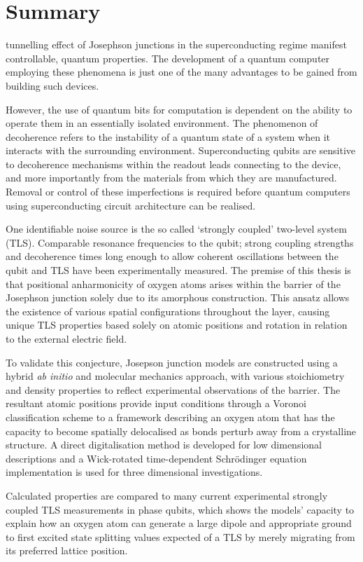 \chapter*{Summary}
\vspace{-1.2cm}
 tunnelling effect of Josephson junctions in the superconducting regime manifest controllable, quantum properties.
The development of a quantum computer employing these phenomena is just one of the many advantages to be gained from building such devices.

However, the use of quantum bits for computation is dependent on the ability to operate them in an essentially isolated environment.
The phenomenon of decoherence refers to the instability of a quantum state of a system when it interacts with the surrounding environment.
Superconducting qubits are sensitive to decoherence mechanisms within the readout leads connecting to the device, and more importantly from the materials from which they are manufactured.
Removal or control of these imperfections is required before quantum computers using superconducting circuit architecture can be realised. 

One identifiable noise source is the so called `strongly coupled' two-level system (TLS).
Comparable resonance frequencies to the qubit; strong coupling strengths and decoherence times long enough to allow coherent oscillations between the qubit and TLS have been experimentally measured.
The premise of this thesis is that positional anharmonicity of oxygen atoms arises within the  barrier of the Josephson junction solely due to its amorphous construction.
This ansatz allows the existence of various spatial configurations throughout the layer, causing unique TLS properties based solely on atomic positions and rotation in relation to the external electric field.

To validate this conjecture, Josepson junction models are constructed using a hybrid \textit{ab initio} and molecular mechanics approach, with various stoichiometry and density properties to reflect experimental observations of the barrier.
The resultant atomic positions provide input conditions through a Voronoi classification scheme to a framework describing an oxygen atom that has the capacity to become spatially delocalised as bonds perturb away from a crystalline structure.
A direct digitalisation method is developed for low dimensional descriptions and a Wick-rotated time-dependent Schrödinger equation implementation is used for three dimensional investigations. 

Calculated properties are compared to many current experimental strongly coupled TLS measurements in phase qubits, which shows the models' capacity to explain how an oxygen atom can generate a large dipole and appropriate ground to first excited state splitting values expected of a TLS by merely migrating from its preferred lattice position.

